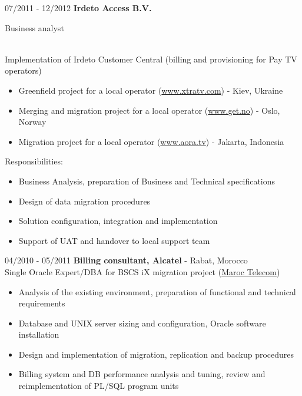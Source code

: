 \documentclass[10pt,a4paper]{extbook}
\begin{document}
07/2011 - 12/2012 \hspace{10mm} \textbf {Irdeto Access B.V.} {\raggedright Business analyst} \\
Implementation of Irdeto Customer Central (billing and provisioning for Pay TV operators)
\begin{itemize}
	\item Greenfield project for a local operator (\url{www.xtratv.com}) - Kiev, Ukraine
	\item Merging and migration project for a local operator (\url{www.get.no}) - Oslo, Norway
	\item Migration project for a local operator (\url{www.aora.tv}) - Jakarta, Indonesia
\end{itemize}

Responsibilities:
\begin{itemize}
	\item Business Analysis, preparation of Business and Technical specifications
	\item Design of data migration procedures
	\item Solution configuration, integration and implementation
	\item Support of UAT and handover to local support team
\end{itemize}

\par\vspace{5mm}
04/2010 - 05/2011 \hspace{10mm} \textbf{Billing consultant, Alcatel} - Rabat, Morocco \\
Single Oracle Expert/DBA for BSCS iX migration project (\href{<www.iam.ma>}{Maroc Telecom})
\begin{itemize}
	\item Analysis of the existing environment, preparation of functional and technical requirements
	\item Database and UNIX server sizing and configuration, Oracle software installation
	\item Design and implementation of migration, replication and backup procedures
	\item Billing system and DB performance analysis and tuning, review and reimplementation of PL/SQL program units
\end{itemize}
\end{document}
